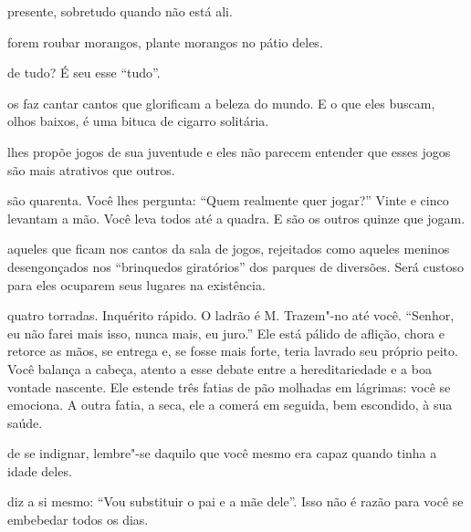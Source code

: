 \pagebreak
\thispagestyle{empty}
\movetooddpage

 presente, sobretudo quando não está ali.

\bigskip
\bigskip

 forem roubar morangos, plante morangos no pátio deles.

\bigskip
\bigskip

 de tudo? É seu esse ``tudo''.

\bigskip
\bigskip

 os faz cantar cantos que glorificam a beleza do mundo. E o que eles
buscam, olhos baixos, é uma bituca de cigarro solitária.

\bigskip
\bigskip

 lhes propõe jogos de sua juventude e eles não parecem entender que
esses jogos são mais atrativos que outros.

\bigskip
\bigskip

 são quarenta. Você lhes pergunta: ``Quem realmente quer jogar?''
Vinte e cinco levantam a mão.
Você leva todos até a quadra. E são os
outros quinze que jogam.

\bigskip
\bigskip

 aqueles que ficam nos cantos da sala de jogos, rejeitados como
aqueles meninos desengonçados nos ``brinquedos giratórios'' dos parques
de diversões. Será custoso para eles ocuparem seus lugares na
existência.

\bigskip
\bigskip


 quatro torradas. Inquérito rápido. O ladrão é M. Trazem"-no até
você. ``Senhor, eu não farei mais isso, nunca mais, eu juro.'' Ele está
pálido de aflição, chora e retorce as mãos, se entrega e, se fosse mais
forte, teria lavrado seu próprio peito. Você balança a cabeça, atento a
esse debate entre a hereditariedade e a boa vontade nascente. Ele
estende três fatias de pão molhadas em lágrimas: você se emociona. A
outra fatia, a seca, ele a comerá em seguida, bem escondido, à sua
saúde.

\bigskip
\bigskip

 de se indignar, lembre"-se daquilo que você mesmo era capaz quando
tinha a idade deles.

\bigskip
\bigskip

 diz a si mesmo: ``Vou substituir o pai e a mãe dele''. Isso não é
razão para você se embebedar todos os dias.

